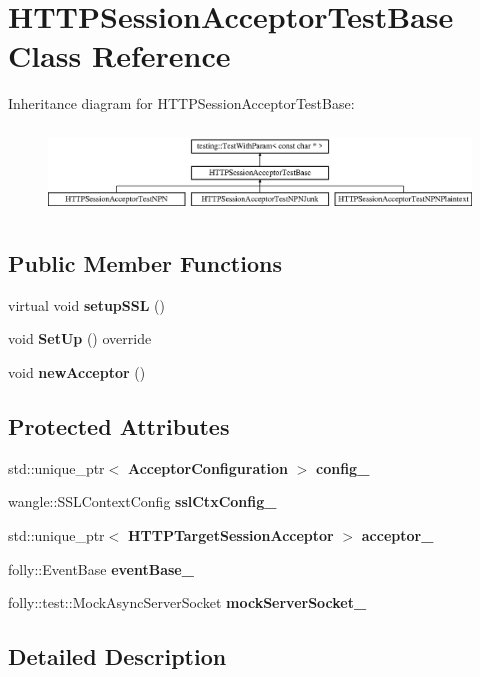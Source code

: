 \section{H\+T\+T\+P\+Session\+Acceptor\+Test\+Base Class Reference}
\label{classHTTPSessionAcceptorTestBase}
Inheritance diagram for H\+T\+T\+P\+Session\+Acceptor\+Test\+Base\+:\begin{figure}[H]
\begin{center}
\leavevmode
\includegraphics[height=2.304527cm]{classHTTPSessionAcceptorTestBase}
\end{center}
\end{figure}
\subsection*{Public Member Functions}
\begin{DoxyCompactItemize}
\item 
virtual void {\bf setup\+S\+SL} ()
\item 
void {\bf Set\+Up} () override
\item 
void {\bf new\+Acceptor} ()
\end{DoxyCompactItemize}
\subsection*{Protected Attributes}
\begin{DoxyCompactItemize}
\item 
std\+::unique\+\_\+ptr$<$ {\bf Acceptor\+Configuration} $>$ {\bf config\+\_\+}
\item 
wangle\+::\+S\+S\+L\+Context\+Config {\bf ssl\+Ctx\+Config\+\_\+}
\item 
std\+::unique\+\_\+ptr$<$ {\bf H\+T\+T\+P\+Target\+Session\+Acceptor} $>$ {\bf acceptor\+\_\+}
\item 
folly\+::\+Event\+Base {\bf event\+Base\+\_\+}
\item 
folly\+::test\+::\+Mock\+Async\+Server\+Socket {\bf mock\+Server\+Socket\+\_\+}
\end{DoxyCompactItemize}


\subsection{Detailed Description}


